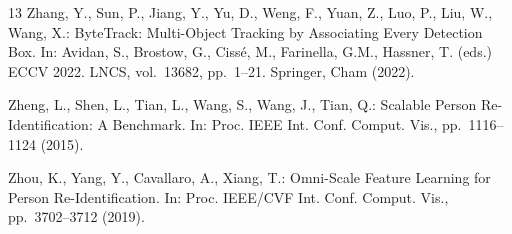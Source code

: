 \documentclass[runningheads]{llncs}
\begin{document}
\begin{thebibliography}{13}
Zhang, Y., Sun, P., Jiang, Y., Yu, D., Weng, F., Yuan, Z., Luo, P., Liu, W., Wang, X.: ByteTrack: Multi-Object Tracking by Associating Every Detection Box. In: Avidan, S., Brostow, G., Ciss\'e, M., Farinella, G.M., Hassner, T. (eds.) ECCV 2022. LNCS, vol.~13682, pp.~1--21. Springer, Cham (2022). 

Zheng, L., Shen, L., Tian, L., Wang, S., Wang, J., Tian, Q.: Scalable Person Re-Identification: A Benchmark. In: Proc. IEEE Int. Conf. Comput. Vis., pp.~1116--1124 (2015). 

Zhou, K., Yang, Y., Cavallaro, A., Xiang, T.: Omni-Scale Feature Learning for Person Re-Identification. In: Proc. IEEE/CVF Int. Conf. Comput. Vis., pp.~3702--3712 (2019). 

\end{thebibliography}
\end{document}
